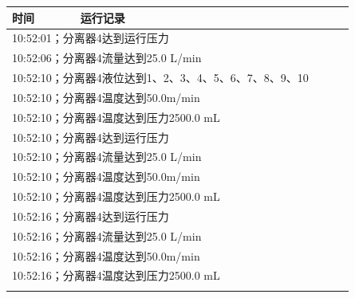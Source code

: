 \documentclass[UTF8,10pt,a4paper,fontset=fandol]{ctexart}
\newcommand{\fieldvalue}[1]{#1}
\begin{document}
\begin{center}
\begin{minipage}[t]{0.47\linewidth}
\scriptsize
\begin{tabular}{|p{0.18\linewidth}|p{0.72\linewidth}|}
\hline
时间 & 运行记录\\ \hline
\multicolumn{2}{|l|}{
\fieldvalue{10:52:01；分离器4达到运行压力}} \\ \hline
\multicolumn{2}{|l|}{
\fieldvalue{10:52:06；分离器4流量达到25.0 L/min}} \\ \hline
\multicolumn{2}{|l|}{
\fieldvalue{10:52:10；分离器4液位达到1、2、3、4、5、6、7、8、9、10}} \\ \hline
\multicolumn{2}{|l|}{
\fieldvalue{10:52:10；分离器4温度达到50.0m/min}} \\ \hline
\multicolumn{2}{|l|}{
\fieldvalue{10:52:10；分离器4温度达到压力2500.0 mL}} \\ \hline
\multicolumn{2}{|l|}{
\fieldvalue{10:52:10；分离器4达到运行压力}} \\ \hline
\multicolumn{2}{|l|}{
\fieldvalue{10:52:10；分离器4流量达到25.0 L/min}} \\ \hline
\multicolumn{2}{|l|}{
\fieldvalue{10:52:10；分离器4温度达到50.0m/min}} \\ \hline
\multicolumn{2}{|l|}{
\fieldvalue{10:52:10；分离器4温度达到压力2500.0 mL}} \\ \hline
\multicolumn{2}{|l|}{
\fieldvalue{10:52:16；分离器4达到运行压力}} \\ \hline
\multicolumn{2}{|l|}{
\fieldvalue{10:52:16；分离器4流量达到25.0 L/min}} \\ \hline
\multicolumn{2}{|l|}{
\fieldvalue{10:52:16；分离器4温度达到50.0m/min}} \\ \hline
\multicolumn{2}{|l|}{
\fieldvalue{10:52:16；分离器4温度达到压力2500.0 mL}} \\ \hline
\multicolumn{2}{|l|}{
}
\end{tabular}
\end{minipage}
\end{center}
\end{document}
